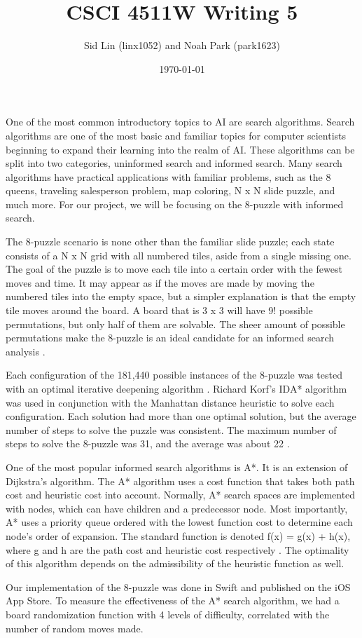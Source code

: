 \documentclass{article}
\title{CSCI 4511W Writing 5}
\date{\today}
\author{Sid Lin (linx1052) and Noah Park (park1623)}
\begin{document}
\maketitle

One of the most common introductory topics to AI are search algorithms. Search algorithms are one of the most basic and familiar topics for computer scientists beginning to expand their learning into the realm of AI. These algorithms can be split into two categories, uninformed search and informed search. Many search algorithms have practical applications with familiar problems, such as the 8 queens, traveling salesperson problem, map coloring, N x N slide puzzle, and much more. For our project, we will be focusing on the 8-puzzle with informed search.

The 8-puzzle scenario is none other than the familiar slide puzzle; each state consists of a N x N grid with all numbered tiles, aside from a single missing one. The goal of the puzzle is to move each tile into a certain order with the fewest moves and time. It may appear as if the moves are made by moving the numbered tiles into the empty space, but a simpler explanation is that the empty tile moves around the board. A board that is 3 x 3 will have 9! possible permutations, but only half of them are solvable. The sheer amount of possible permutations make the 8-puzzle is an ideal candidate for an informed search analysis \cite{piltaver2012pathology}. 

Each configuration of the 181,440 possible instances of the 8-puzzle was tested with an optimal iterative deepening algorithm \cite{reinefeld1993complete}. Richard Korf's IDA* algorithm was used in conjunction with the Manhattan distance heuristic to solve each configuration. Each solution had more than one optimal solution, but the average number of steps to solve the puzzle was consistent. The maximum number of steps to solve the 8-puzzle was 31, and the average was about 22 \cite{reinefeld1993complete}.

One of the most popular informed search algorithms is A*. It is an extension of Dijkstra's algorithm. The A* algorithm uses a cost function that takes both path cost and heuristic cost into account. Normally, A* search spaces are implemented with nodes, which can have children and a predecessor node. Most importantly, A* uses a priority queue ordered with the lowest function cost to determine each node's order of expansion. The standard function is denoted f(x) = g(x) + h(x), where g and h are the path cost and heuristic cost respectively \cite{nosrati2012investigation}. The optimality of this algorithm depends on the admissibility of the heuristic function as well.

Our implementation of the 8-puzzle was done in Swift and published on the iOS App Store. To measure the effectiveness of the A* search algorithm, we had a board randomization function with 4 levels of difficulty, correlated with the number of random moves made. 





\end{document}

